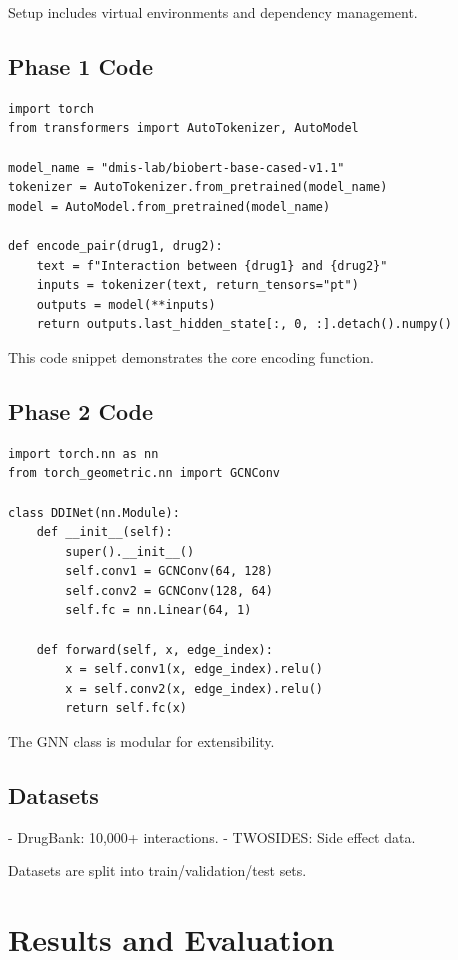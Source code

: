 \documentclass[12pt,a4paper]{article}
\begin{document}
Setup includes virtual environments and dependency management.

\subsection{Phase 1 Code}
\begin{lstlisting}
import torch
from transformers import AutoTokenizer, AutoModel

model_name = "dmis-lab/biobert-base-cased-v1.1"
tokenizer = AutoTokenizer.from_pretrained(model_name)
model = AutoModel.from_pretrained(model_name)

def encode_pair(drug1, drug2):
    text = f"Interaction between {drug1} and {drug2}"
    inputs = tokenizer(text, return_tensors="pt")
    outputs = model(**inputs)
    return outputs.last_hidden_state[:, 0, :].detach().numpy()
\end{lstlisting}

This code snippet demonstrates the core encoding function.

\subsection{Phase 2 Code}
\begin{lstlisting}
import torch.nn as nn
from torch_geometric.nn import GCNConv

class DDINet(nn.Module):
    def __init__(self):
        super().__init__()
        self.conv1 = GCNConv(64, 128)
        self.conv2 = GCNConv(128, 64)
        self.fc = nn.Linear(64, 1)

    def forward(self, x, edge_index):
        x = self.conv1(x, edge_index).relu()
        x = self.conv2(x, edge_index).relu()
        return self.fc(x)
\end{lstlisting}

The GNN class is modular for extensibility.

\subsection{Datasets}
- DrugBank: 10,000+ interactions.
- TWOSIDES: Side effect data.

Datasets are split into train/validation/test sets.

\section{Results and Evaluation}
\label{sec:results}
\end{document}

